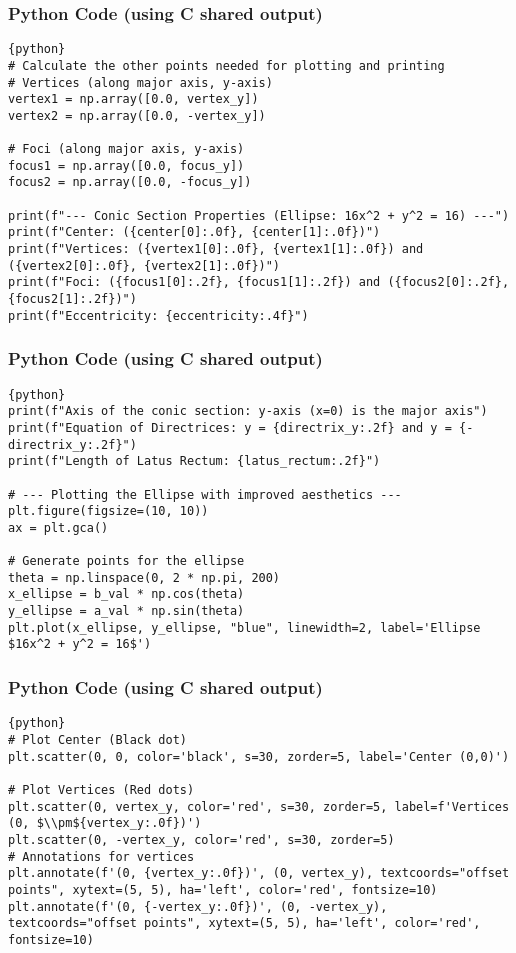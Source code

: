 \documentclass{beamer}
\begin{document}
\begin{frame}[fragile]
\frametitle{Python Code (using C shared output)}
\begin{lstlisting}{python}
# Calculate the other points needed for plotting and printing
# Vertices (along major axis, y-axis)
vertex1 = np.array([0.0, vertex_y])
vertex2 = np.array([0.0, -vertex_y])

# Foci (along major axis, y-axis)
focus1 = np.array([0.0, focus_y])
focus2 = np.array([0.0, -focus_y])

print(f"--- Conic Section Properties (Ellipse: 16x^2 + y^2 = 16) ---")
print(f"Center: ({center[0]:.0f}, {center[1]:.0f})")
print(f"Vertices: ({vertex1[0]:.0f}, {vertex1[1]:.0f}) and ({vertex2[0]:.0f}, {vertex2[1]:.0f})")
print(f"Foci: ({focus1[0]:.2f}, {focus1[1]:.2f}) and ({focus2[0]:.2f}, {focus2[1]:.2f})")
print(f"Eccentricity: {eccentricity:.4f}")
\end{lstlisting}
\end{frame}

\begin{frame}[fragile]
\frametitle{Python Code (using C shared output)}
\begin{lstlisting}{python}
print(f"Axis of the conic section: y-axis (x=0) is the major axis")
print(f"Equation of Directrices: y = {directrix_y:.2f} and y = {-directrix_y:.2f}")
print(f"Length of Latus Rectum: {latus_rectum:.2f}")

# --- Plotting the Ellipse with improved aesthetics ---
plt.figure(figsize=(10, 10))
ax = plt.gca()

# Generate points for the ellipse
theta = np.linspace(0, 2 * np.pi, 200)
x_ellipse = b_val * np.cos(theta)
y_ellipse = a_val * np.sin(theta)
plt.plot(x_ellipse, y_ellipse, "blue", linewidth=2, label='Ellipse $16x^2 + y^2 = 16$')
\end{lstlisting}
\end{frame}

\begin{frame}[fragile]
\frametitle{Python Code (using C shared output)}
\begin{lstlisting}{python}
# Plot Center (Black dot)
plt.scatter(0, 0, color='black', s=30, zorder=5, label='Center (0,0)')

# Plot Vertices (Red dots)
plt.scatter(0, vertex_y, color='red', s=30, zorder=5, label=f'Vertices (0, $\\pm${vertex_y:.0f})')
plt.scatter(0, -vertex_y, color='red', s=30, zorder=5)
# Annotations for vertices
plt.annotate(f'(0, {vertex_y:.0f})', (0, vertex_y), textcoords="offset points", xytext=(5, 5), ha='left', color='red', fontsize=10)
plt.annotate(f'(0, {-vertex_y:.0f})', (0, -vertex_y), textcoords="offset points", xytext=(5, 5), ha='left', color='red', fontsize=10)
\end{lstlisting}
\end{frame}
\end{document}
